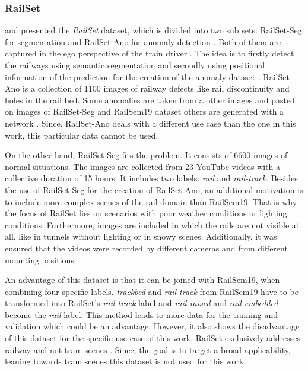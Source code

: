 \subsubsection{RailSet}
\cite{railSet2022} and \cite{hadded2022application} presented the \textit{RailSet} dataset,
which is divided into two sub sets: RailSet-Seg for segmentation and RailSet-Ano for anomaly detection \cite{railSet2022}.
Both of them are captured in the ego perspective of the train driver \cite{railSet2022} \cite{hadded2022application}.
The idea is to firstly detect the railways using semantic segmentation and secondly using positional information of the prediction for the creation of the anomaly dataset \cite{railSet2022}.
RailSet-Ano is a collection of 1100 images of railway defects like rail discontinuity and holes in the rail bed.
Some anomalies are taken from a other images and pasted on images of RailSet-Seg and RailSem19 dataset others are generated with a network \cite{railSet2022}.
Since, RailSet-Ano deals with a different use case than the one in this work, this particular data cannot be used.

On the other hand, RailSet-Seg fits the problem. It consists of 6600 images of normal situations.
The images are collected from 23 YouTube videos with a collective duration of 15 hours. It includes two labels: \textit{rail} and \textit{rail-track}.
Besides the use of  RailSet-Seg for the creation of RailSet-Ano, an additional motivation is to include more complex scenes of the rail domain than RailSem19.
That is why the focus of RailSet lies on scenarios with poor weather conditions or lighting conditions.
Furthermore, images are included in which the rails are not visible at all, like in tunnels without lighting or in snowy scenes.
Additionally, it was ensured that the videos were recorded by different cameras and from different mounting positions \cite{railSet2022} \cite{hadded2022application}. 

An advantage of this dataset is that it can be joined with RailSem19, when combining four specific labels.
\textit{trackbed} and \textit{rail-track} from RailSem19 have to be transformed into RailSet's \textit{rail-track} label and \textit{rail-raised} and \textit{rail-embedded} become the \textit{rail} label.
This method leads to more data for the training and validation which could be an advantage.
However, it also shows the disadvantage of this dataset for the specific use case of this work. 
RailSet exclusively addresses railway and not tram scenes \cite{hadded2022application}.
Since, the goal is to target a broad applicability, leaning towards tram scenes this dataset is not used for this work.

